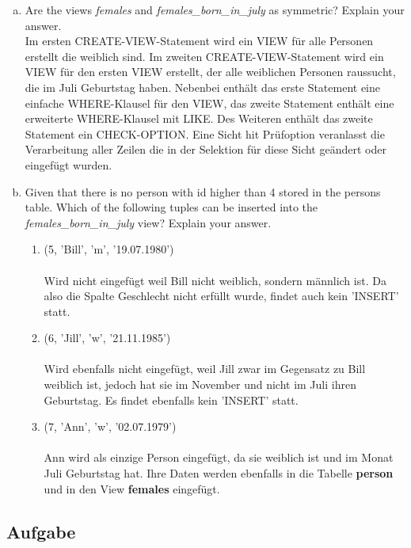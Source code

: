 \documentclass[11pt,a4paper,DIV=9]{scrartcl}
\newcounter{temp}
\newcommand{\aufgabe}[1]{
  \setcounter{temp}{\value{subsection}}
  \setcounter{subsection}{#1}
  \addtocounter{subsection}{-1}
  \subsection{Aufgabe}
  \setcounter{subsection}{\value{temp}}
}
\begin{document}
  \begin{enumerate}[a.]
  \item Are the views \textit{females} and \textit{females\_born\_in\_july} as symmetric? Explain your answer. \\
  Im ersten CREATE-VIEW-Statement wird ein VIEW f\"ur alle Personen erstellt die weiblich sind.
  Im zweiten CREATE-VIEW-Statement wird ein VIEW f\"ur den ersten VIEW erstellt, der alle weiblichen Personen raussucht, die im Juli Geburtstag haben. Nebenbei enth\"alt das erste Statement eine einfache WHERE-Klausel f\"ur den VIEW, das zweite Statement enth\"alt eine erweiterte WHERE-Klausel mit LIKE. Des Weiteren enth\"alt das zweite Statement ein CHECK-OPTION. Eine Sicht hit Pr\"ufoption veranlasst die Verarbeitung aller Zeilen die in der Selektion f\"ur diese Sicht ge\"andert oder eingef\"ugt wurden.  \item Given that there is no person with id higher than 4 stored in the persons table. Which of the following tuples can be inserted into the \textit{females\_born\_in\_july} view? Explain your answer.
  \begin{enumerate}[1.]
  \item (5, 'Bill', 'm', '19.07.1980')
  \\\\Wird nicht eingef\"ugt weil Bill nicht weiblich, sondern m\"annlich ist. Da also die Spalte Geschlecht nicht erf\"ullt wurde, findet auch kein 'INSERT' statt.
  \item (6, 'Jill', 'w', '21.11.1985')
  \\\\Wird ebenfalls nicht eingef\"ugt, weil Jill zwar im Gegensatz zu Bill weiblich ist, jedoch hat sie im November und nicht im Juli ihren Geburtstag. Es findet ebenfalls kein 'INSERT' statt.
  \item (7, 'Ann', 'w', '02.07.1979')
  \\\\Ann wird als einzige Person eingef\"ugt, da sie weiblich ist und im Monat Juli Geburtstag hat. Ihre Daten werden ebenfalls in die Tabelle \textbf{person} und in den View \textbf{females} eingef\"ugt.
  \end{enumerate}
  \end{enumerate}
  \aufgabe{3}
\end{document}
